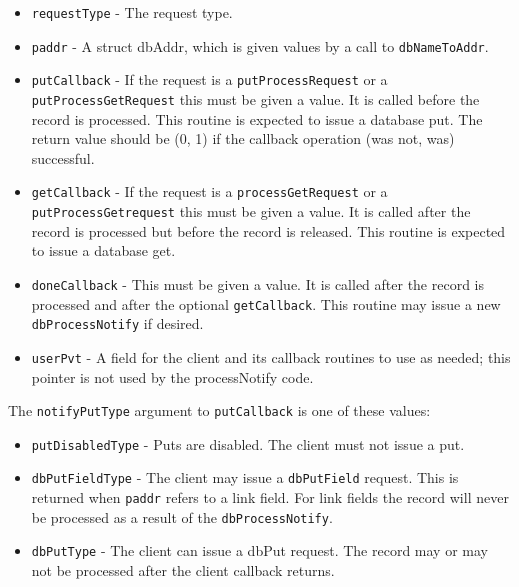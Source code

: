 \begin{itemize}

\item \verb|requestType| - The request type.

\item \verb|paddr| - A struct dbAddr, which is given values by a call to \verb|dbNameToAddr|.

\item \verb|putCallback| - If the request is a \verb|putProcessRequest| or a \verb|putProcessGetRequest| this must be given a value.
It is called before the record is processed.
This routine is expected to issue a database put.
The return value should be (0, 1) if the callback operation (was not, was) successful.

\item \verb|getCallback| - If the request is a \verb|processGetRequest| or a \verb|putProcessGetrequest| this must be given a value.
It is called after the record is processed but before the record is released.
This routine is expected to issue a database get.

\item \verb|doneCallback| - This must be given a value.
It is called after the record is processed and after the optional \verb|getCallback|.
This routine may issue a new \verb|dbProcessNotify| if desired.

\item \verb|userPvt| - A field for the client and its callback routines to use as needed; this pointer is not used by the processNotify code.
\end{itemize}

The \verb|notifyPutType| argument to \verb|putCallback| is one of these values:

\begin{itemize}

\item \verb|putDisabledType| - Puts are disabled.
The client must not issue a put.

\item \verb|dbPutFieldType| - The client may issue a \verb|dbPutField| request.
This is returned when \verb|paddr| refers to a link field.
For link fields the record will never be processed as a result of the \verb|dbProcessNotify|.

\item \verb|dbPutType| - The client can issue a dbPut request.
The record may or may not be processed after the client callback returns.
\end{itemize}

